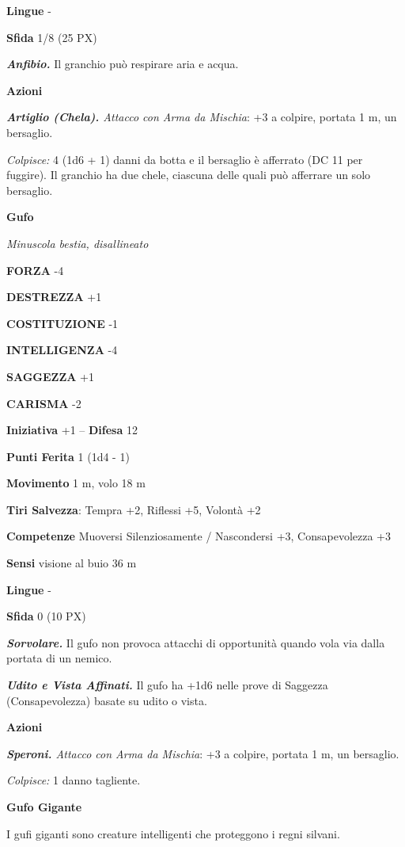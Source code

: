 \begin{multicols}{2}
\textbf{Lingue} -

\textbf{Sfida} 1/8 (25 PX)

\textit{\textbf{Anfibio.}} Il granchio può respirare aria e acqua.

\textbf{Azioni}

\textit{\textbf{Artiglio (Chela).} Attacco con Arma da Mischia}: +3 a colpire, portata 1 m, un bersaglio.

\textit{Colpisce:} 4 (1d6 + 1) danni da botta e il bersaglio è afferrato (DC 11 per fuggire). Il granchio ha due chele, ciascuna delle quali può afferrare un solo bersaglio.

\medskip\textbf{Gufo}

\textit{Minuscola bestia, disallineato}

\textbf{FORZA} -4

\textbf{DESTREZZA} +1

\textbf{COSTITUZIONE} -1

\textbf{INTELLIGENZA} -4

\textbf{SAGGEZZA} +1

\textbf{CARISMA} -2

\textbf{Iniziativa} +1 -- \textbf{Difesa} 12

\textbf{Punti Ferita} 1 (1d4 - 1)

\textbf{Movimento} 1 m, volo 18 m

\textbf{Tiri Salvezza}: Tempra +2, Riflessi +5, Volontà +2

\textbf{Competenze} Muoversi Silenziosamente / Nascondersi +3, Consapevolezza +3

\textbf{Sensi} visione al buio 36 m

\textbf{Lingue} -

\textbf{Sfida} 0 (10 PX)

\textit{\textbf{Sorvolare.}} Il gufo non provoca attacchi di opportunità quando vola via dalla portata di un nemico.

\textit{\textbf{Udito e Vista Affinati.}} Il gufo ha +1d6 nelle prove di Saggezza (Consapevolezza) basate su udito o vista.

\textbf{Azioni}

\textit{\textbf{Speroni.} Attacco con Arma da Mischia}: +3 a colpire, portata 1 m, un bersaglio.

\textit{Colpisce:} 1 danno tagliente.

\medskip\textbf{Gufo Gigante}

I gufi giganti sono creature intelligenti che proteggono i regni silvani.


\end{multicols}
